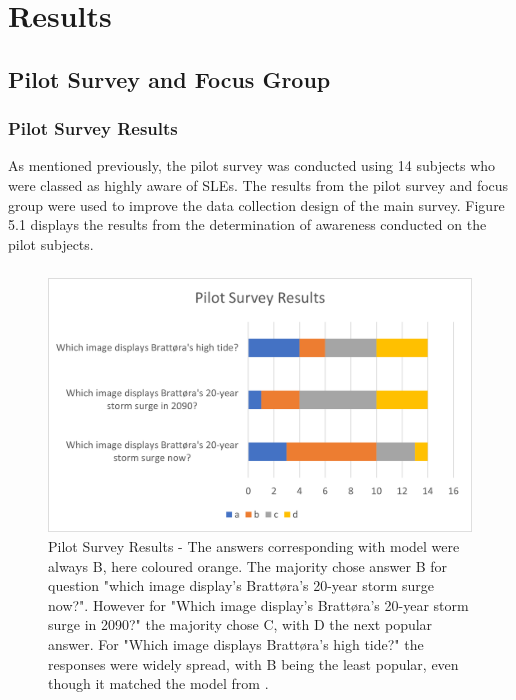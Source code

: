 \chapter{Results}

\section{Pilot Survey and Focus Group}

\subsection{Pilot Survey Results}
As mentioned previously, the pilot survey was conducted using 14 subjects who were classed as highly aware of SLEs. The results from the pilot survey and focus group were used to improve the data collection design of the main survey. Figure 5.1 displays the results from the determination of awareness conducted on the pilot subjects.
\paragraph{}

\begin{figure}[H]
    \centering
    \includegraphics{fig_results/pilot-survey-results.png}
    \caption{Pilot Survey Results - The answers corresponding with \cite{kartverket_se_2020} model were always B, here coloured orange.   The majority chose answer B for question "which image display's Brattøra's 20-year storm surge now?". However for "Which image display's Brattøra's 20-year storm surge in 2090?" the majority chose C, with D the next popular answer. For "Which image displays Brattøra's high tide?" the responses were widely spread, with B being the least popular, even though it matched the model from \cite{kartverket_se_2020}.    }
    \label{fig:pilot_survey_results}
\end{figure}

